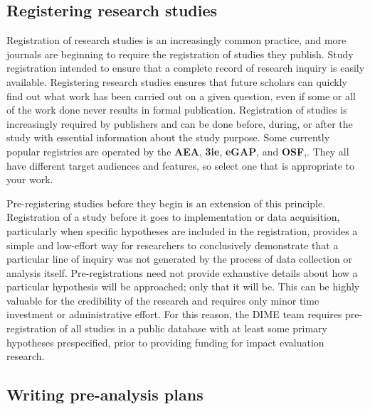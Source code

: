 \subsection{Registering research studies}

Registration of research studies is an increasingly common practice,
and more journals are beginning to require
the registration of studies they publish.\cite{vilhuber2020report}
Study registration intended to ensure that a complete record of research inquiry is easily available.
Registering research studies ensures that future scholars can quickly
find out what work has been carried out on a given question,
even if some or all of the work done never results in formal publication.
Registration of studies is increasingly required by publishers
and can be done before, during, or after the study
with essential information about the study purpose.
Some currently popular registries are operated by the 
\textbf{AEA},
\textbf{3ie},
\textbf{eGAP},
and \textbf{OSF},.
They all have different target audiences and features,
so select one that is appropriate to your work.

Pre-registering studies before they begin is an extension of this principle.\cite{nosek2018preregistration}
Registration of a study before it goes to implementation or data acquisition,
particularly when specific hypotheses are included in the registration,
provides a simple and low-effort way for researchers
to conclusively demonstrate that a particular line of inquiry
was not generated by the process of data collection or analysis itself.
Pre-registrations need not provide exhaustive details about how
a particular hypothesis will be approached; only that it will be.
This can be highly valuable for the credibility of the research
and requires only minor time investment or administrative effort.
For this reason, the DIME team requires pre-registration of all studies
in a public database with at least some primary hypotheses prespecified,
prior to providing funding for impact evaluation research.

\subsection{Writing pre-analysis plans}

